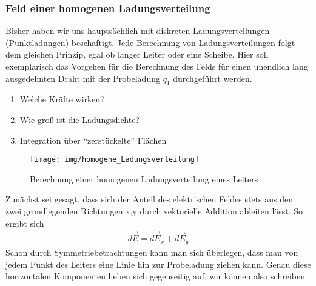 \subsubsection{Feld einer homogenen Ladungsverteilung} Bisher haben wir uns hauptsächlich mit diskreten Ladungsverteilungen (Punktladungen) beschäftigt. Jede Berechnung von Ladungsverteilungen folgt dem gleichen Prinzip, egal ob langer Leiter oder eine Scheibe. Hier soll exemplarisch das Vorgehen für die Berechnung des Felds für einen unendlich lang ausgedehnten Draht mit der Probeladung $q_1$ durchgeführt werden. \begin{enumerate}
\item Welche Kräfte wirken?
\item Wie groß ist die Ladungsdichte?
\item Integration über "`zerstückelte"' Flächen
\end{enumerate}\begin{figure}\begin{center}
\texttt{[image: img/homogene\_Ladungsverteilung]}
\end{center}
\caption{Berechnung einer homogenen Ladungsverteilung eines Leiters}
\label{pic:Ladungsverteilung}
\end{figure}
Zunächst sei gesagt, dass sich der Anteil des elektrischen Feldes stets aus den zwei grundlegenden Richtungen x,y durch vektorielle Addition ableiten lässt. So ergibt sich \begin{align*}
\vec{dE} = \vec{dE}_x + \vec{dE}_y
\end{align*}Schon durch Symmetriebetrachtungen kann man sich überlegen, dass man von jedem Punkt des Leiters eine Linie hin zur Probeladung ziehen kann. Genau diese horizontalen Komponenten heben sich gegenseitig auf, wir können also schreiben
